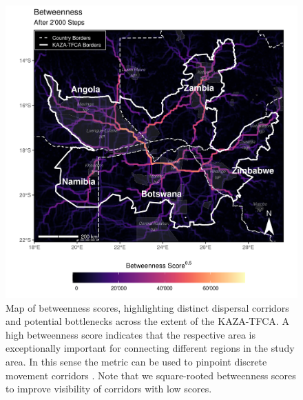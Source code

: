 \documentclass[abstract=on,10pt,a4paper,bibliography=totocnumbered]{article}
\begin{document}
\begin{figure}
  \includegraphics[width=\textwidth]{99_Betweenness.png}
  \caption{Map of betweenness scores, highlighting distinct dispersal corridors
  and potential bottlenecks across the extent of the KAZA-TFCA. A high
  betweenness score indicates that the respective area is exceptionally
  important for connecting different regions in the study area. In this sense
  the metric can be used to pinpoint discrete movement corridors
  \citep{BastilleRousseau.2018}. Note that we square-rooted betweenness scores
  to improve visibility of corridors with low scores.}
  \label{Betweenness}
\end{figure}
\end{document}

